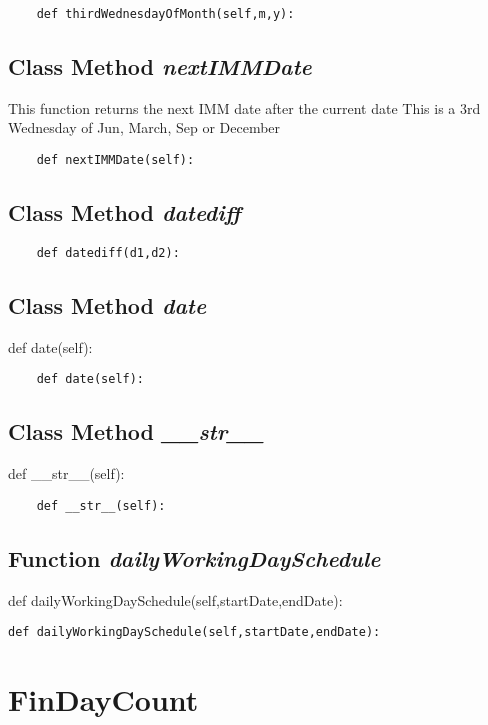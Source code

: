 \documentclass[twoside,11pt]{book}
\begin{document}
\begin{lstlisting}
    def thirdWednesdayOfMonth(self,m,y):
\end{lstlisting}

\subsection{Class Method {\it nextIMMDate}}
This function returns the next IMM date after the current date This is a 3rd Wednesday of Jun, March, Sep or December 

\begin{lstlisting}
    def nextIMMDate(self):
\end{lstlisting}

\subsection{Class Method {\it datediff}}


\begin{lstlisting}
    def datediff(d1,d2):
\end{lstlisting}

\subsection{Class Method {\it date}}
def date(self):

\begin{lstlisting}
    def date(self):
\end{lstlisting}

\subsection{Class Method {\it \_\_str\_\_}}
def \_\_str\_\_(self):

\begin{lstlisting}
    def __str__(self):
\end{lstlisting}

\subsection{Function {\it dailyWorkingDaySchedule}}
def dailyWorkingDaySchedule(self,startDate,endDate):

\begin{lstlisting}
def dailyWorkingDaySchedule(self,startDate,endDate):
\end{lstlisting}

\newpage
\section{FinDayCount}
\end{document}
